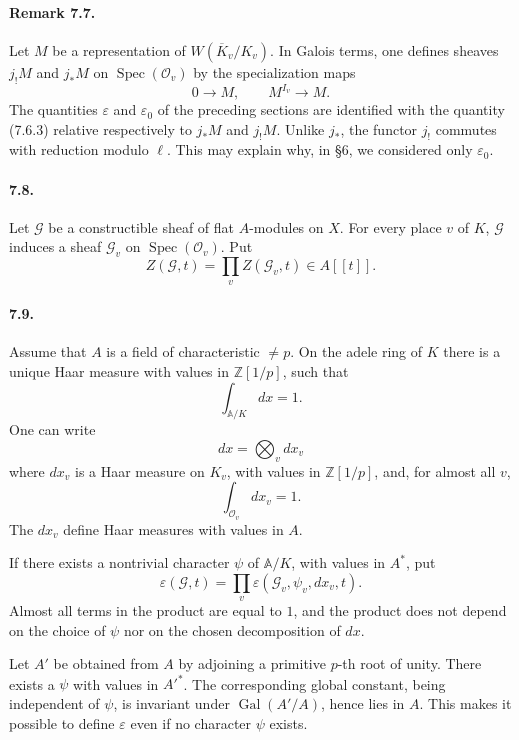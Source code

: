 \documentclass[10pt]{article}
\newcommand{\Gal}{\operatorname{Gal}}
\newcommand{\Spec}{\operatorname{Spec}}
\providecommand{\Spec}{\operatorname{Spec}}
\providecommand{\Gal}{\operatorname{Gal}}
\providecommand{\Gal}{\operatorname{Gal}}
\providecommand{\Spec}{\operatorname{Spec}}
\providecommand{\Spec}{\operatorname{Spec}}
\providecommand{\Gal}{\operatorname{Gal}}
\providecommand{\Gal}{\operatorname{Gal}}
\begin{document}
\paragraph{Remark 7.7.} Let \(M\) be a representation of \(W(\overline K_v/K_v)\). In Galois terms, one defines sheaves \(j_!M\) and \(j_*M\) on \(\Spec(\mathcal O_v)\) by the specialization maps
\[
0\longrightarrow M,
\qquad
M^{I_v}\longrightarrow M.
\]
The quantities \(\varepsilon\) and \(\varepsilon_0\) of the preceding sections are identified with the quantity (7.6.3) relative respectively to \(j_*M\) and \(j_!M\). Unlike \(j_*\), the functor \(j_!\) commutes with reduction modulo \(\ell\). This may explain why, in §6, we considered only \(\varepsilon_0\).

\paragraph{7.8.} Let \(\mathcal G\) be a constructible sheaf of flat \(A\)-modules on \(X\). For every place \(v\) of \(K\), \(\mathcal G\) induces a sheaf \(\mathcal G_v\) on \(\Spec(\mathcal O_v)\). Put
\[
\tag{7.8.1}
Z(\mathcal G,t)=\prod_v Z(\mathcal G_v,t)\in A[[t]].
\]

\paragraph{7.9.} Assume that \(A\) is a field of characteristic \(\ne p\). On the adele ring of \(K\) there is a unique Haar measure with values in \(\mathbb Z[1/p]\), such that
\[
\int_{\mathbb A/K}dx=1.
\]
One can write
\[
dx=\bigotimes_v dx_v
\]
where \(dx_v\) is a Haar measure on \(K_v\), with values in \(\mathbb Z[1/p]\), and, for almost all \(v\),
\[
\int_{\mathcal O_v}dx_v=1.
\]
The \(dx_v\) define Haar measures with values in \(A\).

If there exists a nontrivial character \(\psi\) of \(\mathbb A/K\), with values in \(A^*\), put
\[
\tag{7.9.1}
\varepsilon(\mathcal G,t)=\prod_v
\varepsilon(\mathcal G_v,\psi_v,dx_v,t).
\]
Almost all terms in the product are equal to \(1\), and the product does not depend on the choice of \(\psi\) nor on the chosen decomposition of \(dx\).

Let \(A'\) be obtained from \(A\) by adjoining a primitive \(p\)-th root of unity. There exists a \(\psi\) with values in \(A'^*\). The corresponding global constant, being independent of \(\psi\), is invariant under \(\Gal(A'/A)\), hence lies in \(A\). This makes it possible to define \(\varepsilon\) even if no character \(\psi\) exists.
\end{document}
